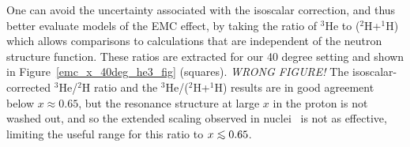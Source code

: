 
One can avoid the uncertainty associated with the isoscalar correction, and
thus better evaluate models of the EMC effect, by taking the ratio of $^3$He
to ($^2$H+$^1$H) which allows comparisons to calculations that are independent
of the neutron structure function.  These ratios are extracted for our 40
degree setting and shown in Figure~\ref{emc_x_40deg_he3_fig} (squares).
\textit{WRONG FIGURE!} 
The isoscalar-corrected $^3$He/$^2$H ratio and the $^3$He/($^2$H+$^1$H)
results are in good agreement below $x \approx 0.65$, but the resonance
structure at large $x$ in the proton is not washed out, and so the extended
scaling observed in nuclei~\cite{Arrington:2003nt} is not as effective,
limiting the useful range for this ratio to $x \ltorder 0.65$.



